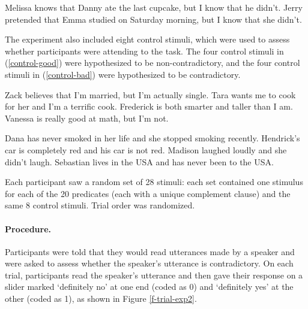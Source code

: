\documentclass[11pt,fleqn]{article}
\newcommand{\6}{\mbox{$[\hspace*{-.6mm}[$}}
\newcommand{\9}{\mbox{$]\hspace*{-.6mm}]$}}
\begin{document}
\begin{exe}
\ex\label{stims}
\begin{xlist}
 Melissa knows that Danny ate the last cupcake, but I know that he didn't.
 Jerry pretended that Emma studied on Saturday morning, but I know that she didn't.
\end{xlist}
\end{exe}

The experiment also included eight control stimuli, which were used to assess whether participants were attending to the task. The four control stimuli in (\ref{control-good}) were hypothesized to be non-contradictory, and the four control stimuli in (\ref{control-bad}) were hypothesized to be contradictory.

\begin{exe}
\ex\label{control-good}
\begin{xlist}
\ex Zack believes that I'm married, but I'm actually single.
\ex Tara wants me to cook for her and I'm a terrific cook.
\ex Frederick is both smarter and taller than I am.
\ex Vanessa is really good at math, but I'm not.
\end{xlist}
\ex\label{control-bad}
\begin{xlist}
\ex Dana has never smoked in her life and she stopped smoking recently.
\ex Hendrick's car is completely red and his car is not red.
\ex Madison laughed loudly and she didn't laugh.
\ex Sebastian lives in the USA and has never been to the USA.
\end{xlist}
\end{exe}

Each participant saw a random set of 28 stimuli: each set contained one stimulus for each of the 20 predicates (each with a unique complement clause) and the same 8 control stimuli. Trial order was randomized.

\paragraph{Procedure.} Participants were told that they would read utterances made by a speaker and were asked to assess whether the speaker's utterance is contradictory. On each trial, participants read the speaker's utterance and then gave their response on a slider marked `definitely no' at one end (coded as 0) and `definitely yes' at the other (coded as 1), as shown in Figure \ref{f-trial-exp2}.   
\end{document}
